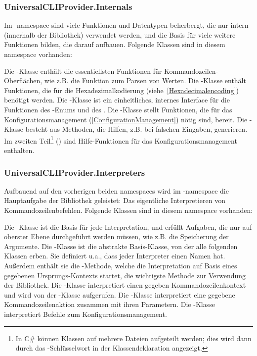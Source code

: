 \subsubsection{UniversalCLIProvider.Internals}
Im -namespace sind viele Funktionen und Datentypen beherbergt, die nur intern (innerhalb der Bibliothek) verwendet werden,
und die Basis für viele weitere Funktionen bilden, die darauf aufbauen.
Folgende Klassen sind in diesem namespace vorhanden:
\begin{outline}
 \1 Die -Klasse enthält die essentiellsten Funktionen für Kommandozeilen-Oberflächen, wie z.B. die Funktion zum Parsen von Werten.
 \1 Die -Klasse enthält Funktionen, die für die Hexadezimalkodierung (siehe~\ref{Hexadecimalencoding}) benötigt werden.
 \1 Die -Klasse ist ein einheitliches, internes Interface für die Funktionen des -Enums und des .
 \1 Die -Klasse stellt Funktionen, die für das Konfigurationsmanagement (\ref{ConfigurationManagement}) nötig sind, bereit.
 \1 Die -Klasse besteht aus Methoden, die Hilfen, z.B. bei falschen Eingaben, generieren.
 Im zweiten Teil\footnote{In C\# können Klassen auf mehrere Dateien aufgeteilt werden; dies wird dann durch das -Schlüsselwort in der Klassendeklaration angezeigt.}
 () sind Hilfe-Funktionen für das Konfigurationsmanagement enthalten.
\end{outline}
\subsubsection{UniversalCLIProvider.Interpreters}
Aufbauend auf den vorherigen beiden namespaces wird im -namespace die Hauptaufgabe der Bibliothek geleistet:
Das eigentliche Interpretieren von Kommandozeilenbefehlen.
Folgende Klassen sind in diesem namespace vorhanden:
\begin{outline}
 \1 Die -Klasse ist die Basis für jede Interpretation, und erfüllt Aufgaben, die nur auf oberster Ebene durchgeführt werden müssen, wie z.B. die Speicherung der Argumente.
 \1 Die -Klasse ist die abstrakte Basis-Klasse, von der alle folgenden Klassen erben.
 Sie definiert u.a., dass jeder Interpreter einen Namen hat.
 Außerdem enthält sie die -Methode, welche die Interpretation auf Basis eines gegebenen Ursprungs-Kontexts startet, die wichtigste Methode zur Verwendung der Bibliothek.
 \1 Die -Klasse interpretiert einen gegeben Kommandozeilenkontext und wird von der -Klasse aufgerufen.
 \1 Die -Klasse interpretiert eine gegebene Kommandozeilenaktion zusammen mit ihren Parametern.
 \1 Die -Klasse interpretiert Befehle zum Konfigurationsmanagement.
\end{outline}
